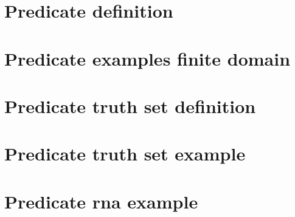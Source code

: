 
\section*{Predicate definition}

\vfill
\section*{Predicate examples finite domain}

\vfill
\section*{Predicate truth set definition}

\vfill
\section*{Predicate truth set example}

\vfill
\section*{Predicate rna example}

\vfill
